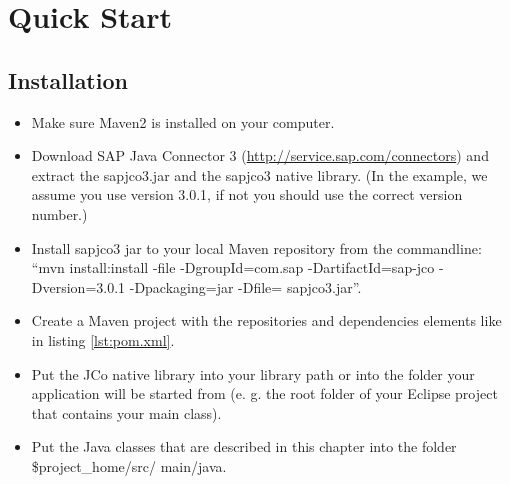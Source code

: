 \chapter{Quick Start}
\label{cha:QuickStart}

\section{Installation}

\begin{itemize}

  \item Make sure Maven2 is installed on your computer.
  
  \item Download SAP Java Connector 3 (\url{http://service.sap.com/connectors}) and extract the sapjco3.jar and the sapjco3 native library. (In the example, we assume you use version 3.0.1, if not you should use the correct version number.)
  
  \item Install sapjco3 jar to your local Maven repository from the commandline: ``mvn install:install -file 
  		-DgroupId=com.sap -DartifactId=sap-jco -Dversion=3.0.1 -Dpackaging=jar -Dfile= sapjco3.jar''.
  
  \item Create a Maven project with the repositories and dependencies elements like in listing \ref{lst:pom.xml}. 
  
  \item Put the JCo native library into your library path or into the folder your application will be started
    from (e. g. the root folder of your Eclipse project that contains your main class).
    
  \item Put the Java classes that are described in this chapter into the folder \$project\_home/src/ main/java.

\end{itemize} 

